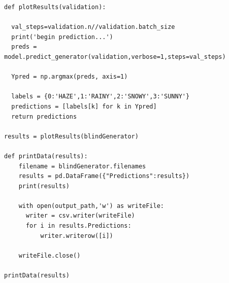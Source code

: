 \documentclass{article}
\begin{document}
\begin{verbatim}
def plotResults(validation):

  val_steps=validation.n//validation.batch_size
  print('begin prediction...')
  preds = model.predict_generator(validation,verbose=1,steps=val_steps)
  
  Ypred = np.argmax(preds, axis=1)

  labels = {0:'HAZE',1:'RAINY',2:'SNOWY',3:'SUNNY'}
  predictions = [labels[k] for k in Ypred]
  return predictions

results = plotResults(blindGenerator)

def printData(results):
    filename = blindGenerator.filenames
    results = pd.DataFrame({"Predictions":results})
    print(results)

    with open(output_path,'w') as writeFile:
      writer = csv.writer(writeFile)
      for i in results.Predictions:
          writer.writerow([i])
        
    writeFile.close()

printData(results)
\end{verbatim}
 
\end{document}
